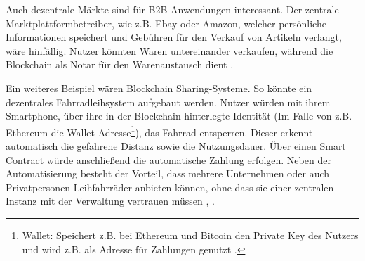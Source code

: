 Auch dezentrale Märkte sind für B2B-Anwendungen interessant. Der zentrale Marktplattformbetreiber, wie z.B. Ebay oder Amazon, welcher persönliche Informationen speichert und Gebühren für den Verkauf von Artikeln verlangt, wäre hinfällig. Nutzer könnten Waren untereinander verkaufen, während die Blockchain als Notar für den Warenaustausch dient \cite{BenHamidaBlockchainEnterpriseOverview2017}.

Ein weiteres Beispiel wären Blockchain Sharing-Systeme. So könnte ein dezentrales Fahrradleihsystem aufgebaut werden. Nutzer würden mit ihrem Smartphone, über ihre in der Blockchain hinterlegte Identität (Im Falle von z.B. Ethereum die Wallet-Adresse\footnote{Wallet: Speichert z.B. bei Ethereum und Bitcoin den Private Key des Nutzers und wird z.B. als Adresse für Zahlungen genutzt \cite{BlockchainWallet}.}), das Fahrrad entsperren. Dieser erkennt automatisch die gefahrene Distanz sowie die Nutzungsdauer. Über einen Smart Contract würde anschließend die automatische Zahlung erfolgen. Neben der Automatisierung besteht der Vorteil, dass mehrere Unternehmen oder auch Privatpersonen Leihfahrräder anbieten können, ohne dass sie einer zentralen Instanz mit der Verwaltung vertrauen müssen \cite{BlockchainBikes}, \cite{FischerIoTBlockchain}.  






